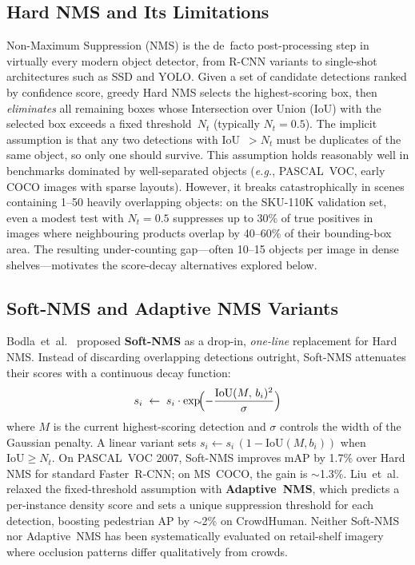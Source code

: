 \documentclass[conference]{IEEEtran}
\newcommand{\eg}{\textit{e.g.}}
\begin{document}
\subsection{Hard NMS and Its Limitations}
\label{sec:hard_nms}

Non-Maximum Suppression (NMS) is the de~facto post-processing step in
virtually every modern object detector, from R-CNN variants to single-shot
architectures such as SSD and YOLO. Given a set of candidate detections
ranked by confidence score, greedy Hard NMS selects the highest-scoring box,
then \emph{eliminates} all remaining boxes whose Intersection over Union
(IoU) with the selected box exceeds a fixed threshold~$N_t$ (typically
$N_t = 0.5$). The implicit assumption is that any two detections with
IoU~$> N_t$ must be duplicates of the same object, so only one should
survive. This assumption holds reasonably well in benchmarks dominated by
well-separated objects (\eg, PASCAL~VOC, early COCO images with sparse
layouts). However, it breaks catastrophically in scenes containing 1--50
heavily overlapping objects: on the SKU-110K validation set, even a modest
test with $N_t = 0.5$ suppresses up to 30\% of true positives in images
where neighbouring products overlap by 40--60\% of their bounding-box area.
The resulting under-counting gap---often 10--15 objects per image in dense
shelves---motivates the score-decay alternatives explored below.

\subsection{Soft-NMS and Adaptive NMS Variants}
\label{sec:soft_nms}

Bodla~et~al.~\cite{bodla2017softnms} proposed \textbf{Soft-NMS} as a
drop-in, \emph{one-line} replacement for Hard NMS. Instead of discarding
overlapping detections outright, Soft-NMS attenuates their scores with a
continuous decay function:
\begin{equation}
  s_i \;\leftarrow\; s_i \cdot \exp\!\Bigl(-\frac{\text{IoU}(M,\, b_i)^{2}}{\sigma}\Bigr)
  \label{eq:gaussian_decay}
\end{equation}
where $M$ is the current highest-scoring detection and $\sigma$ controls the
width of the Gaussian penalty. A linear variant sets
$s_i \leftarrow s_i \,(1 - \text{IoU}(M, b_i))$ when
$\text{IoU} \geq N_t$. On PASCAL~VOC
2007, Soft-NMS improves mAP by 1.7\% over Hard NMS for standard
Faster~R-CNN; on MS~COCO, the gain is $\sim$1.3\%. Liu~et~al.~%
\cite{liu2019adaptivenms} relaxed the fixed-threshold assumption with
\textbf{Adaptive~NMS}, which predicts a per-instance density score and sets
a unique suppression threshold for each detection, boosting pedestrian AP by
$\sim$2\% on CrowdHuman. Neither Soft-NMS nor Adaptive~NMS has been
systematically evaluated on retail-shelf imagery where occlusion patterns
differ qualitatively from crowds.
\end{document}
